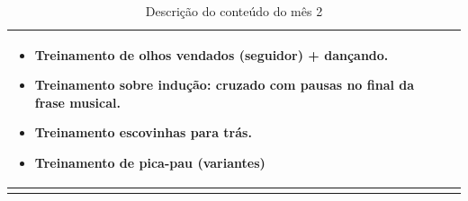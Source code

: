 \documentclass[12pt, a4paper]{article}
\begin{document}
\begin{longtable}{|p{0.5cm}|p{3.0cm}|p{12.0cm}|}
        \begin{itemize}
        \item Treinamento de olhos vendados (seguidor) + dançando.
        \item Treinamento sobre indução: cruzado com pausas no final da frase musical.
        \item Treinamento escovinhas para trás.
        \item Treinamento de pica-pau (variantes)
        \end{itemize}
        \\ \hline 
\caption{Descrição do conteúdo do mês 2}
\label{tab:myfirsttable2}
\end{longtable}


\newpage
\end{document}
